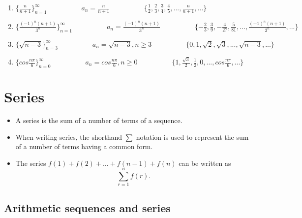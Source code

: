 \documentclass[]{book}
\providecommand{\tightlist}{%
  \setlength{\itemsep}{0pt}\setlength{\parskip}{0pt}}
\begin{document}
\begin{enumerate}
\def\labelenumi{\alph{enumi})}
\item
  \(\{\frac{n}{n+1}\}_{n=1}^{\infty} \hspace{5em} a_{n} = \frac{n}{n+1}\hspace{5em}\{\frac{1}{2},\frac{2}{3}, \frac{3}{4}, \frac{4}{5},..., \frac{n}{n+1},... \}\)
\item
  \(\{\frac{(-1)^n(n+1)}{3^{n}}\}_{n=1}^{\infty} \hspace{5em} a_{n} = \frac{(-1)^n(n+1)}{3^{n}}\hspace{5em}\{-\frac{2}{3},\frac{3}{9}, -\frac{4}{27}, \frac{5}{81},..., \frac{(-1)^n(n+1)}{3^{n}},... \}\)
\item
  \(\{\sqrt{n-3}\}_{n=3}^{\infty} \hspace{5em} a_{n} = \sqrt{n-3}, n\geq3\hspace{5em}\{0,1,\sqrt{2}, \sqrt{3},..., \sqrt{n-3},...\}\)
\item
  \(\{cos\frac{n\pi}{6}\}_{n=0}^{\infty} \hspace{5em} a_{n} = cos\frac{n\pi}{6}, n\geq 0 \hspace{5em}\{1, \frac{\sqrt{3}}{2},\frac{1}{2}, 0,...,cos\frac{n\pi}{6},...\}\)
\end{enumerate}

\hypertarget{series}{%
\section{Series}\label{series}}

\begin{itemize}
\tightlist
\item
  A series is the sum of a number of terms of a sequence.
\item
  When writing series, the shorthand \(\sum\) notation is used to represent the sum of a number of terms having a common form.
\item
  The series \(f(1)+ f(2)+\dots+ f(n−1)+ f(n)\) can be written as
  \[\sum_{r=1}^nf(r).\]
\end{itemize}

\hypertarget{arithmetic-sequences-and-series}{%
\subsection{Arithmetic sequences and series}\label{arithmetic-sequences-and-series}}
\end{document}
